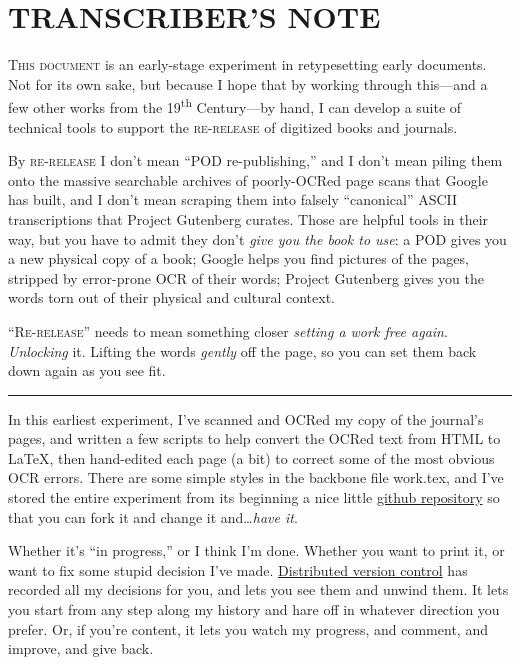 \chapter*[Transcriber's Note]{TRANSCRIBER'S NOTE}
\lettrine[lines=3]{T}{his document} is an early-stage experiment in retypesetting early documents. Not for its own sake, but because I hope that by working through this---and a few other works from the 19\textsuperscript{th} Century---by hand, I can develop a suite of technical tools to support the \textsc{re-release} of digitized books and journals.

By \textsc{re-release} I don't mean ``POD re-publishing,'' and I don't mean piling them onto the massive searchable archives of poorly-OCRed page scans that Google has built, and I don't mean scraping them into falsely ``canonical'' ASCII transcriptions that Project Gutenberg curates. Those are helpful tools in their way, but you have to admit they don't \emph{give you the book to use}: a POD gives  you a new physical copy of a book; Google helps you find pictures of the pages, stripped by error-prone OCR of their words; Project Gutenberg gives you the words torn out of their physical and cultural context.

\textsc{``Re-release''} needs to mean something closer \emph{setting a work free again}. \emph{Unlocking} it. Lifting the words \emph{gently}  off the page, so you can set them back down again as you see fit.

\fancybreak{\ding{167}}

In this earliest experiment, I've scanned and OCRed my copy of the journal's pages, and written a few scripts to help convert the OCRed text from HTML to \LaTeX, then hand-edited each page (a bit) to correct some of the most obvious OCR errors. There are some simple styles in the backbone file \textsf{work.tex}, and I've stored the entire experiment from its beginning a nice little \href{http://github.com/Vaguery/collegeJournalOfMedicalScienceSeptember1857}{github repository} so that you can fork it and change it and\ldots \emph{have it}.

Whether it's ``in progress,'' or I think I'm done. Whether you want to print it, or want to fix some stupid decision I've made. \href{http://git-scm.com/}{Distributed version control} has recorded all my decisions for you, and lets you see them and unwind them. It lets you start from any step along my history and hare off in whatever direction you prefer. Or, if you're content, it lets you watch my progress, and comment, and improve, and give back.

